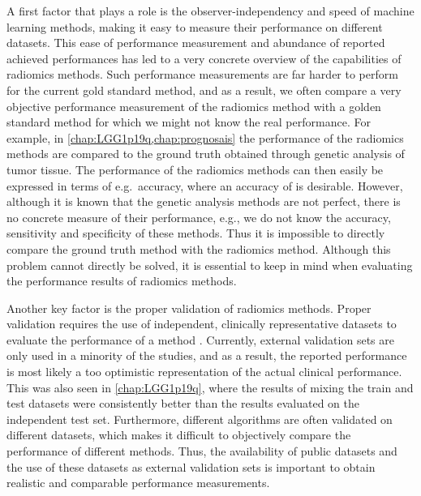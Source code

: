 A first factor that plays a role is the observer-independency and speed of machine learning methods, making it easy to measure their performance on different datasets.
This ease of performance measurement and abundance of reported achieved performances has led to a very concrete overview of the capabilities of radiomics methods.
Such performance measurements are far harder to perform for the current gold standard method, and as a result, we often compare a very objective performance measurement of the radiomics method with a golden standard method for which we might not know the real performance.
For example, in \cref{chap:LGG1p19q,chap:prognosais} the performance of the radiomics methods are compared to the ground truth obtained through genetic analysis of \gls{tumor} tissue.
The performance of the radiomics methods can then easily be expressed in terms of e.g.\ accuracy, where an accuracy of  is desirable.
However, although it is known that the genetic analysis methods are not perfect, there is no concrete measure of their performance, e.g., we do not know the accuracy, sensitivity and specificity of these methods.
Thus it is impossible to directly compare the ground truth method with the radiomics method.
Although this problem cannot directly be solved, it is essential to keep in mind when evaluating the performance results of radiomics methods.

Another key factor is the proper validation of radiomics methods.
Proper validation requires the use of independent, clinically representative datasets to evaluate the performance of a method \autocite{gillies2016radiomics, rizzo2018radiomics, lohmann2020radiomics, yip2016applicationsradiomics}.
Currently, external validation sets are only used in a minority of the studies, and as a result, the reported performance is most likely a too optimistic representation of the actual clinical performance.
This was also seen in \cref{chap:LGG1p19q}, where the results of mixing the train and test datasets were consistently better than the results evaluated on the independent test set.
Furthermore, different algorithms are often validated on different datasets, which makes it difficult to objectively compare the performance of different methods.
Thus, the availability of public datasets and the use of these datasets as external validation sets is important to obtain realistic and comparable performance measurements.

